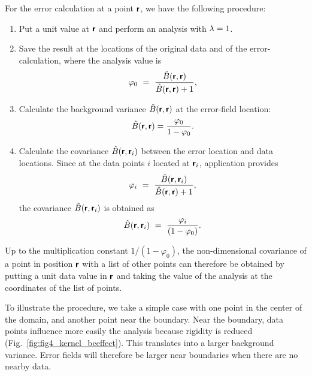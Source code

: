 For the error calculation at a point $\mbox{\boldmath $ \protect\mathsf{r} $}$, we have the following procedure: 

\begin{enumerate}

\item Put a unit value at $\mbox{\boldmath $ \protect\mathsf{r} $}$ and perform an analysis with $\lambda=1$.

\item Save the result at the locations of the original data and of the error-calculation, where the analysis value is
\begin{equation}
\varphi_0 ~=~{ \hat{B} (\mbox{\boldmath $ \protect\mathsf{r} $},\mbox{\boldmath $ \protect\mathsf{r} $}) \over \hat{B}(\mbox{\boldmath $ \protect\mathsf{r} $},\mbox{\boldmath $ \protect\mathsf{r} $}) + 1 },
\end{equation}

\item Calculate the background variance $\hat{B}(\mbox{\boldmath $ \protect\mathsf{r} $},\mbox{\boldmath $ \protect\mathsf{r} $})$ at the error-field location:
\begin{equation}
\hat{B} (\mbox{\boldmath $ \protect\mathsf{r} $},\mbox{\boldmath $ \protect\mathsf{r} $}) = { \varphi_0 \over 1 - \varphi_0}.
\label{eq:brr}
\end{equation}

\item Calculate the covariance $\hat{B} (\mbox{\boldmath $ \protect\mathsf{r} $},\mbox{\boldmath $ \protect\mathsf{r} $}_i)$ between the error location and data locations. Since at the data points $i$ located at $\mbox{\boldmath $ \protect\mathsf{r} $}_i$, \diva application provides
\begin{equation}
\varphi_i ~=~ { \hat{B} (\mbox{\boldmath $ \protect\mathsf{r} $},\mbox{\boldmath $ \protect\mathsf{r} $}_i) \over \hat{B}(\mbox{\boldmath $ \protect\mathsf{r} $},\mbox{\boldmath $ \protect\mathsf{r} $}) + 1 },
\end{equation}
the covariance $\hat{B} (\mbox{\boldmath $ \protect\mathsf{r} $},\mbox{\boldmath $ \protect\mathsf{r} $}_i)$ is obtained as
\begin{equation}
\hat{B} (\mbox{\boldmath $ \protect\mathsf{r} $},\mbox{\boldmath $ \protect\mathsf{r} $}_i)~=~{\varphi_i \over ( 1-\varphi_0 )}.
\label{eq:btildco}
\end{equation}

\end{enumerate}

Up to the multiplication constant $1/(1-\varphi_0)$, the non-dimensional covariance of a point in position $\mbox{\boldmath $ \protect\mathsf{r} $}$ with a list of other points can therefore be obtained by putting a unit data value in $\mbox{\boldmath $ \protect\mathsf{r} $}$ and taking the value of the analysis at the coordinates of the list of points. 

To illustrate the procedure, we take a simple case with one point in the center of the domain, and another point near the boundary.
Near the boundary, data points influence more easily the analysis because rigidity is reduced (Fig.~\ref{fig:fig4_kernel_bceffect}). This translates into a larger background variance. Error fields will therefore be larger near boundaries when there are no nearby data.
 
